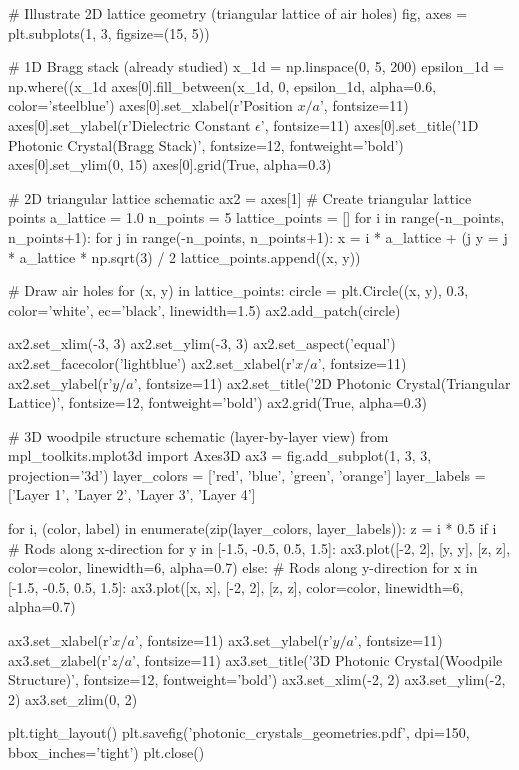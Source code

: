 \documentclass[11pt,a4paper]{article}
\begin{document}
\begin{pycode}
# Illustrate 2D lattice geometry (triangular lattice of air holes)
fig, axes = plt.subplots(1, 3, figsize=(15, 5))

# 1D Bragg stack (already studied)
x_1d = np.linspace(0, 5, 200)
epsilon_1d = np.where((x_1d %
axes[0].fill_between(x_1d, 0, epsilon_1d, alpha=0.6, color='steelblue')
axes[0].set_xlabel(r'Position $x/a$', fontsize=11)
axes[0].set_ylabel(r'Dielectric Constant $\epsilon$', fontsize=11)
axes[0].set_title('1D Photonic Crystal\n(Bragg Stack)', fontsize=12, fontweight='bold')
axes[0].set_ylim(0, 15)
axes[0].grid(True, alpha=0.3)

# 2D triangular lattice schematic
ax2 = axes[1]
# Create triangular lattice points
a_lattice = 1.0
n_points = 5
lattice_points = []
for i in range(-n_points, n_points+1):
    for j in range(-n_points, n_points+1):
        x = i * a_lattice + (j %
        y = j * a_lattice * np.sqrt(3) / 2
        lattice_points.append((x, y))

# Draw air holes
for (x, y) in lattice_points:
    circle = plt.Circle((x, y), 0.3, color='white', ec='black', linewidth=1.5)
    ax2.add_patch(circle)

ax2.set_xlim(-3, 3)
ax2.set_ylim(-3, 3)
ax2.set_aspect('equal')
ax2.set_facecolor('lightblue')
ax2.set_xlabel(r'$x/a$', fontsize=11)
ax2.set_ylabel(r'$y/a$', fontsize=11)
ax2.set_title('2D Photonic Crystal\n(Triangular Lattice)', fontsize=12, fontweight='bold')
ax2.grid(True, alpha=0.3)

# 3D woodpile structure schematic (layer-by-layer view)
from mpl_toolkits.mplot3d import Axes3D
ax3 = fig.add_subplot(1, 3, 3, projection='3d')
layer_colors = ['red', 'blue', 'green', 'orange']
layer_labels = ['Layer 1', 'Layer 2', 'Layer 3', 'Layer 4']

for i, (color, label) in enumerate(zip(layer_colors, layer_labels)):
    z = i * 0.5
    if i %
        # Rods along x-direction
        for y in [-1.5, -0.5, 0.5, 1.5]:
            ax3.plot([-2, 2], [y, y], [z, z], color=color, linewidth=6, alpha=0.7)
    else:
        # Rods along y-direction
        for x in [-1.5, -0.5, 0.5, 1.5]:
            ax3.plot([x, x], [-2, 2], [z, z], color=color, linewidth=6, alpha=0.7)

ax3.set_xlabel(r'$x/a$', fontsize=11)
ax3.set_ylabel(r'$y/a$', fontsize=11)
ax3.set_zlabel(r'$z/a$', fontsize=11)
ax3.set_title('3D Photonic Crystal\n(Woodpile Structure)', fontsize=12, fontweight='bold')
ax3.set_xlim(-2, 2)
ax3.set_ylim(-2, 2)
ax3.set_zlim(0, 2)

plt.tight_layout()
plt.savefig('photonic_crystals_geometries.pdf', dpi=150, bbox_inches='tight')
plt.close()
\end{pycode}
\end{document}
